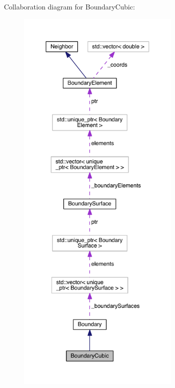 Collaboration diagram for Boundary\+Cubic\+:\nopagebreak
\begin{figure}[H]
\begin{center}
\leavevmode
\includegraphics[height=550pt]{classBoundaryCubic__coll__graph}
\end{center}
\end{figure}
